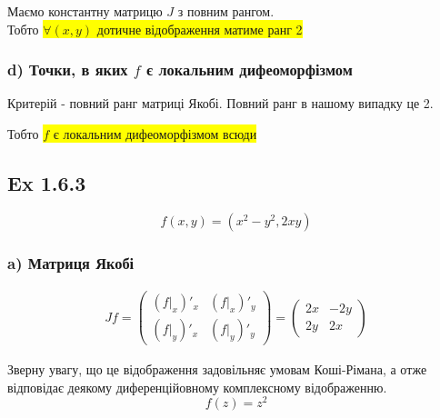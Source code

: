 \documentclass[10pt, a4paper]{article} %
\begin{document}
Маємо константну матрицю $J$ з повним рангом. \\
Тобто \colorbox{yellow}{$\forall (x,y)$ дотичне відображення матиме ранг 2}

\subsubsection*{d) Точки, в яких $f$ є локальним дифеоморфізмом}
Критерій - повний ранг матриці Якобі.
Повний ранг в нашому випадку це 2.

Тобто \colorbox{yellow}{$f$ є локальним дифеоморфізмом всюди}

\subsection*{Ex 1.6.3}
\[f(x,y) = (x^2-y^2, 2xy)\]
\subsubsection*{a) Матриця Якобі}
\begin{align*}
    Jf = \begin{pmatrix}
        (f|_x)'_x & (f|_x)'_y\\
        (f|_y)'_x & (f|_y)'_y
    \end{pmatrix} 
    = \begin{pmatrix}
        2x & -2y\\
        2y & 2x
    \end{pmatrix}
\end{align*}

Зверну увагу, що це відображення задовільняє умовам Коші-Рімана, а отже відповідає деякому диференційовному комплексному відображенню.
\[f(z)=z^2\]
\end{document}
